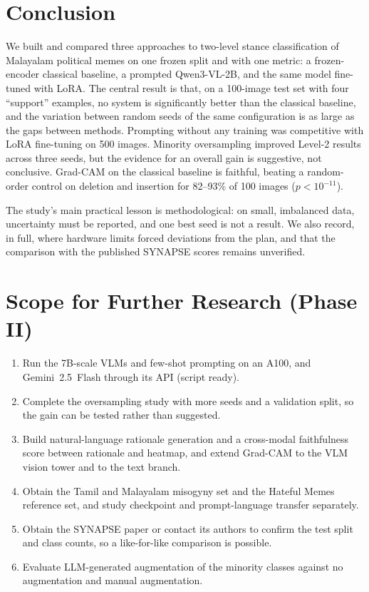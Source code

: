 \section{Conclusion}

We built and compared three approaches to two-level stance classification of Malayalam political memes on one frozen split and with one metric: a frozen-encoder classical baseline, a prompted Qwen3-VL-2B, and the same model fine-tuned with LoRA. The central result is that, on a 100-image test set with four ``support'' examples, no system is significantly better than the classical baseline, and the variation between random seeds of the same configuration is as large as the gaps between methods. Prompting without any training was competitive with LoRA fine-tuning on 500 images. Minority oversampling improved Level-2 results across three seeds, but the evidence for an overall gain is suggestive, not conclusive. Grad-CAM on the classical baseline is faithful, beating a random-order control on deletion and insertion for 82--93\% of 100 images ($p<10^{-11}$).

The study's main practical lesson is methodological: on small, imbalanced data, uncertainty must be reported, and one best seed is not a result. We also record, in full, where hardware limits forced deviations from the plan, and that the comparison with the published SYNAPSE scores remains unverified.

\section{Scope for Further Research (Phase II)}

\begin{enumerate}
    \item Run the 7B-scale VLMs and few-shot prompting on an A100, and Gemini~2.5~Flash through its API (script ready).
    \item Complete the oversampling study with more seeds and a validation split, so the gain can be tested rather than suggested.
    \item Build natural-language rationale generation and a cross-modal faithfulness score between rationale and heatmap, and extend Grad-CAM to the VLM vision tower and to the text branch.
    \item Obtain the Tamil and Malayalam misogyny set and the Hateful Memes reference set, and study checkpoint and prompt-language transfer separately.
    \item Obtain the SYNAPSE paper or contact its authors to confirm the test split and class counts, so a like-for-like comparison is possible.
    \item Evaluate LLM-generated augmentation of the minority classes against no augmentation and manual augmentation.
\end{enumerate}
